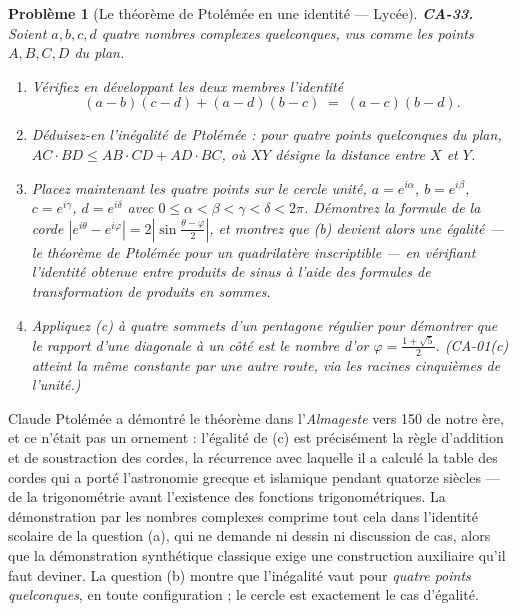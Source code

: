 \documentclass[11pt]{article}
\newtheorem{problem}{Problème}
\begin{document}
\begin{problem}[{Le théorème de Ptolémée en une identité --- Lycée}]
\textbf{CA-33.} Soient $ a, b, c, d $ quatre nombres complexes quelconques, vus comme les
points $ A, B, C, D $ du plan.
\begin{enumerate}
\item[(a)] Vérifiez en développant les deux membres l'identité
\[ (a - b)(c - d) + (a - d)(b - c) \;=\; (a - c)(b - d) . \]
\item[(b)] Déduisez-en l'inégalité de Ptolémée : pour quatre points quelconques du plan,
$ AC \cdot BD \le AB \cdot CD + AD \cdot BC $, où $ XY $ désigne la distance entre
$ X $ et $ Y $.
\item[(c)] Placez maintenant les quatre points sur le cercle unité, $ a = e^{i\alpha} $, $ b = e^{i\beta} $,
$ c = e^{i\gamma} $, $ d = e^{i\delta} $ avec $ 0 \le \alpha < \beta < \gamma < \delta < 2\pi $.
Démontrez la formule de la corde $ |e^{i\theta} - e^{i\varphi}| = 2\left|\sin\frac{\theta - \varphi}{2}\right| $,
et montrez que (b) devient alors une \textit{égalité} --- le théorème de Ptolémée pour un quadrilatère
inscriptible --- en vérifiant l'identité obtenue entre produits de sinus à l'aide des formules de
transformation de produits en sommes.
\item[(d)] Appliquez (c) à quatre sommets d'un pentagone régulier pour démontrer que le rapport d'une
diagonale à un côté est le nombre d'or $ \varphi = \frac{1 + \sqrt{5}}{2} $. (CA-01(c) atteint la
même constante par une autre route, via les racines cinquièmes de l'unité.)
\end{enumerate}

\end{problem}

\noindent Claude Ptolémée a démontré le théorème dans l'\textit{Almageste} vers 150 de notre
ère, et ce n'était pas un ornement : l'égalité de (c) est précisément la règle d'addition et de
soustraction des cordes, la récurrence avec laquelle il a calculé la table des cordes qui a porté
l'astronomie grecque et islamique pendant quatorze siècles --- de la trigonométrie avant l'existence
des fonctions trigonométriques. La démonstration par les nombres complexes comprime tout cela dans
l'identité scolaire de la question (a), qui ne demande ni dessin ni discussion de cas, alors que la
démonstration synthétique classique exige une construction auxiliaire qu'il faut deviner. La
question (b) montre que l'inégalité vaut pour \textit{quatre points quelconques}, en toute
configuration ; le cercle est exactement le cas d'égalité.
\end{document}
